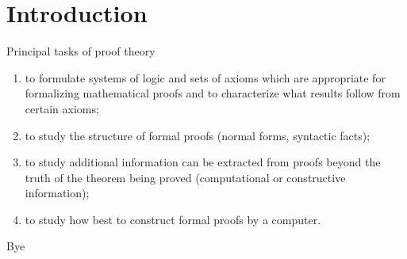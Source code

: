 \documentclass[xcolor=dvipsnames, aspectratio=169, 10pt]{beamer}
\begin{document}
\TitlePage
\SectionPage
\SubsectionPage
\ProgressBar
\PageNumbering
\section{Introduction}
\begin{frame}
	Principal tasks of proof theory \cite{buss1998handbook}
	\begin{enumerate}
		\item to formulate systems of logic and sets of axioms which are appropriate for formalizing mathematical proofs and to characterize what results follow from certain axioms;
		\item to study the structure of formal proofs (normal forms, syntactic facts);
		\item to study additional information can be extracted from proofs beyond the truth of the theorem being proved (computational or constructive information);
		\item to study how best to construct formal proofs by a computer.
	\end{enumerate}
\end{frame}

\begin{frame}
	Bye
\end{frame}
\begin{frame}
  \printbibliography
\end{frame}
\end{document}
